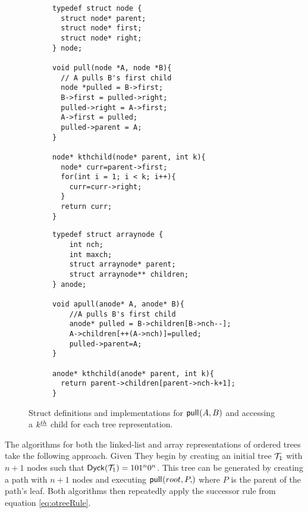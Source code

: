 \begin{figure}[H]
    \begin{subfigure}[t]{.5 \textwidth}
	\begin{center}

	    \begin{Verbatim}
typedef struct node {
  struct node* parent;
  struct node* first;
  struct node* right;
} node;

void pull(node *A, node *B){ 
  // A pulls B's first child
  node *pulled = B->first;
  B->first = pulled->right;
  pulled->right = A->first;
  A->first = pulled;
  pulled->parent = A;
}

node* kthchild(node* parent, int k){
  node* curr=parent->first;
  for(int i = 1; i < k; i++){
    curr=curr->right;
  }
  return curr;
}
\end{Verbatim}
	\end{center}
	\label{fig:}
    \end{subfigure}
    \begin{subfigure}[t]{.5 \textwidth}
	\begin{center}

	    \begin{Verbatim}
typedef struct arraynode {
    int nch; 
    int maxch;
    struct arraynode* parent;
    struct arraynode** children;
} anode;

void apull(anode* A, anode* B){ 
    //A pulls B's first child
    anode* pulled = B->children[B->nch--];
    A->children[++(A->nch)]=pulled;
    pulled->parent=A;
}

anode* kthchild(anode* parent, int k){
  return parent->children[parent->nch-k+1];
}
	    \end{Verbatim}
	\end{center}
	\label{fig:}
    \end{subfigure}

    \cprotect\caption{Struct definitions and implementations for $\mathsf{pull}_{}(A,B)$ and accessing a $k^{\underline{th}}$ child for each tree representation.}
    \label{fig:otreeStarter}
\end{figure}


The algorithms for both the linked-list and array representations of ordered trees take the following approach.  Given They begin by creating an initial tree $\mathcal{T}_1$ with $n+1$ nodes such that $\mathsf{Dyck}{(\mathcal{T}_1)}=101^{n}0^{n}$.  This tree can be generated by creating a path with $n+1$ nodes and executing $\pull{root,P}$ where $P$ is the parent of the path's leaf. Both algorithms then repeatedly apply the successor rule from equation \ref{eq:otreeRule}.  


